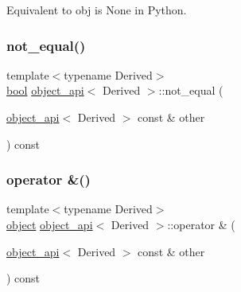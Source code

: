 Equivalent to {\ttfamily obj is None} in Python. 

\mbox{\label{classobject__api_acd277a1d6dea84b197d78925b523133c}} 
\subsubsection{\texorpdfstring{not\_equal()}{not\_equal()}}
{\footnotesize\ttfamily template$<$typename Derived$>$ \\
\mbox{\hyperlink{asdl_8h_af6a258d8f3ee5206d682d799316314b1}{bool}} \mbox{\hyperlink{classobject__api}{object\+\_\+api}}$<$ Derived $>$\+::not\+\_\+equal (\begin{DoxyParamCaption}\item[{\mbox{\hyperlink{classobject__api}{object\+\_\+api}}$<$ Derived $>$ const \&}]{other }\end{DoxyParamCaption}) const\hspace{0.3cm}{\ttfamily [inline]}}

\mbox{\label{classobject__api_a9c05418ebf1a3bb27c981a3738212264}} 
\subsubsection{\texorpdfstring{operator \&()}{operator \&()}}
{\footnotesize\ttfamily template$<$typename Derived$>$ \\
\mbox{\hyperlink{classobject}{object}} \mbox{\hyperlink{classobject__api}{object\+\_\+api}}$<$ Derived $>$\+::operator \& (\begin{DoxyParamCaption}\item[{\mbox{\hyperlink{classobject__api}{object\+\_\+api}}$<$ Derived $>$ const \&}]{other }\end{DoxyParamCaption}) const}

\mbox{\label{classobject__api_aa2e1efe3fe71542b4ebb71cd3df86283}} 
